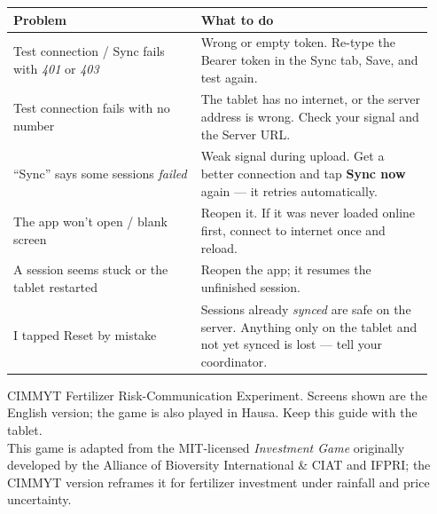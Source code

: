 \documentclass[11pt]{article}
\begin{document}
\begin{center}
\begin{tabular}{@{}p{0.42\linewidth}p{0.52\linewidth}@{}}
\toprule
\textbf{Problem} & \textbf{What to do} \\
\midrule
Test connection / Sync fails with \emph{401} or \emph{403} & Wrong or empty token. Re-type the
Bearer token in the Sync tab, Save, and test again. \\
Test connection fails with no number & The tablet has no internet, or the server address is wrong.
Check your signal and the Server URL. \\
``Sync'' says some sessions \emph{failed} & Weak signal during upload. Get a better connection and
tap \textbf{Sync now} again --- it retries automatically. \\
The app won't open / blank screen & Reopen it. If it was never loaded online first, connect to
internet once and reload. \\
A session seems stuck or the tablet restarted & Reopen the app; it resumes the unfinished session. \\
I tapped Reset by mistake & Sessions already \emph{synced} are safe on the server. Anything only on the
tablet and not yet synced is lost --- tell your coordinator. \\
\bottomrule
\end{tabular}
\end{center}

\vfill
\begin{center}
{\small\color{inkgrey} CIMMYT Fertilizer Risk-Communication Experiment. Screens shown are the English
version; the game is also played in Hausa. Keep this guide with the tablet.\\[4pt]
This game is adapted from the MIT-licensed \emph{Investment Game} originally developed by the Alliance of
Bioversity International \& CIAT and IFPRI; the CIMMYT version reframes it for fertilizer investment under
rainfall and price uncertainty.}
\end{center}
\end{document}
